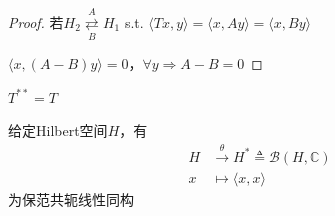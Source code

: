\documentclass[lang=cn,a4paper,newtx,section]{elegantbook}
\begin{document}
\begin{proof}
  若$H_2 \underset{B}{\overset{A}{\rightleftarrows}} H_1$ s.t. $\langle Tx, y \rangle = \langle x, Ay \rangle = \langle x, By \rangle$
  
  $\langle x, (A-B)y \rangle = 0$，$\forall y \Rightarrow A - B = 0$
\end{proof}

\begin{proposition}
  $T^{**} = T$
\end{proposition}

\begin{theorem}[Riesz表示定理]
  给定Hilbert空间$H$，有
  \begin{equation*}
    \begin{aligned}
      H &\xrightarrow{\theta} H^* \triangleq \mathcal{B}(H, \mathbb{C}) \\
      x &\longmapsto \langle x, x\rangle
    \end{aligned}
  \end{equation*}
  为保范共轭线性同构
\end{theorem}
\end{document}
